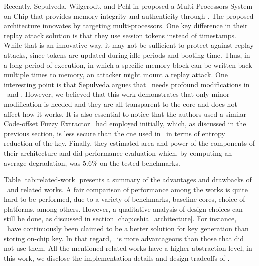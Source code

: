 Recently, Sepulveda, Wilgerodt, and Pehl in \cite{Sepulveda2018:CSHIA} proposed a Multi-Processors System-on-Chip that provides memory integrity and authenticity through \pufs. The proposed architecture innovates by targeting multi-processors. %
One key difference in their replay attack solution is that they use session tokens instead of timestamps. While that is an innovative way, it may not be sufficient to protect against replay attacks, since tokens are updated during idle periods and booting time. Thus, in a long period of execution, in which a specific memory block can be written back multiple times to memory, an attacker might mount a replay attack. One interesting point is that Sepulveda \etal argues that \cshia~needs profound modifications in \soc~and \cpu. However, we believed that this work demonstrates that only minor modification is needed and they are all transparent to the core and does not affect how it works. It is also essential to notice that the authors used a similar Code-offset Fuzzy Extractor \cshia~had employed initially, which, as discussed in the previous section, is less secure than the one used in \cshia~in terms of entropy reduction of the key. Finally, they estimated area and power of the components of their architecture and did performance evaluation which, by computing an average degradation, was 5.6\% on the tested benchmarks.

Table \ref{tab:related-work} presents a summary of the advantages and drawbacks of \cshia~and related works. A fair comparison of performance among the works is quite hard to be performed, due to a variety of benchmarks, baseline cores, choice of platforms, among others. However, a qualitative analysis of design choices can still be done, as discussed in section \ref{chap:cshia_architecture}. For instance, \pufs~have continuously been claimed to be a better solution for key generation than storing on-chip key. In that regard, \cshia~is more advantageous than those that did not use them. All the mentioned related works have a higher abstraction level, in this work, we disclose the implementation details and design tradeoffs of \cshia. 






